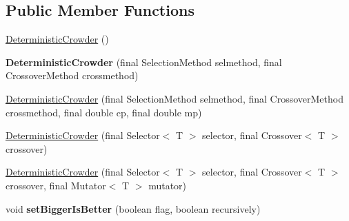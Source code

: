 \subsection*{Public Member Functions}
\begin{DoxyCompactItemize}
\item 
\hyperlink{classjenes_1_1stage_1_1operator_1_1common_1_1_deterministic_crowder_3_01_t_01extends_01_chromosome_01_4_ad52c0d6a4bc032c8c198bf05cc3acf6f}{Deterministic\-Crowder} ()
\item 
\hypertarget{classjenes_1_1stage_1_1operator_1_1common_1_1_deterministic_crowder_3_01_t_01extends_01_chromosome_01_4_ae974a4b359a9a467dfa434dd47a27cf7}{{\bfseries Deterministic\-Crowder} (final Selection\-Method selmethod, final Crossover\-Method crossmethod)}\label{classjenes_1_1stage_1_1operator_1_1common_1_1_deterministic_crowder_3_01_t_01extends_01_chromosome_01_4_ae974a4b359a9a467dfa434dd47a27cf7}

\item 
\hyperlink{classjenes_1_1stage_1_1operator_1_1common_1_1_deterministic_crowder_3_01_t_01extends_01_chromosome_01_4_aa59e2a1dcdb2cd6cc7a70e344a77dd31}{Deterministic\-Crowder} (final Selection\-Method selmethod, final Crossover\-Method crossmethod, final double cp, final double mp)
\item 
\hyperlink{classjenes_1_1stage_1_1operator_1_1common_1_1_deterministic_crowder_3_01_t_01extends_01_chromosome_01_4_ad7eed64a7fe60239ba3289ebf6003e8c}{Deterministic\-Crowder} (final Selector$<$ T $>$ selector, final Crossover$<$ T $>$ crossover)
\item 
\hyperlink{classjenes_1_1stage_1_1operator_1_1common_1_1_deterministic_crowder_3_01_t_01extends_01_chromosome_01_4_a6359043178a5e4d8922485528acbbcec}{Deterministic\-Crowder} (final Selector$<$ T $>$ selector, final Crossover$<$ T $>$ crossover, final Mutator$<$ T $>$ mutator)
\item 
\hypertarget{classjenes_1_1stage_1_1operator_1_1common_1_1_deterministic_crowder_3_01_t_01extends_01_chromosome_01_4_af7b258f528b701713808c16bca29ca66}{void {\bfseries set\-Bigger\-Is\-Better} (boolean flag, boolean recursively)}\label{classjenes_1_1stage_1_1operator_1_1common_1_1_deterministic_crowder_3_01_t_01extends_01_chromosome_01_4_af7b258f528b701713808c16bca29ca66}

\end{DoxyCompactItemize}
